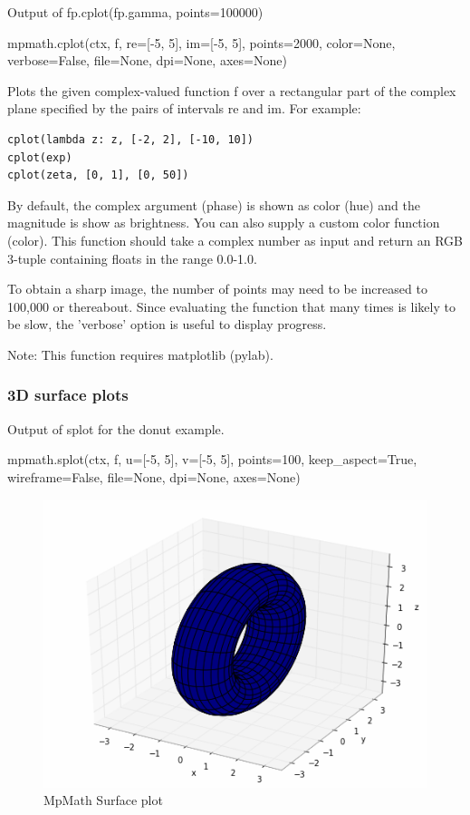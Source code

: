 Output of fp.cplot(fp.gamma, points=100000)

\vpara
mpmath.cplot(ctx, f, re=[-5, 5], im=[-5, 5], points=2000, color=None, verbose=False, file=None, dpi=None, axes=None)

\vpara
Plots the given complex-valued function f over a rectangular part of the complex plane specified by the pairs of intervals re and im. For example:

\begin{lstlisting}
cplot(lambda z: z, [-2, 2], [-10, 10])
cplot(exp)
cplot(zeta, [0, 1], [0, 50])
\end{lstlisting}


By default, the complex argument (phase) is shown as color (hue) and the magnitude is show as brightness. You can also supply a custom color function (color). This function should take a complex number as input and return an RGB 3-tuple containing floats in the range 0.0-1.0.

\vpara
To obtain a sharp image, the number of points may need to be increased to 100,000 or thereabout. Since evaluating the function that many times is likely to be slow, the 'verbose' option is useful to display progress.

Note: This function requires matplotlib (pylab).


\newpage
\subsubsection{3D surface plots}


Output of splot for the donut example.

\vpara
mpmath.splot(ctx, f, u=[-5, 5], v=[-5, 5], points=100, keep\_aspect=True, wireframe=False, file=None, dpi=None, axes=None)

\begin{figure}[ht]
	\centering
	\includegraphics[scale=1.0]{Charts/png/MpMathSplot.png}
	\caption{MpMath Surface plot}
	\label{Fig MpMath Surface plot}
\end{figure}


